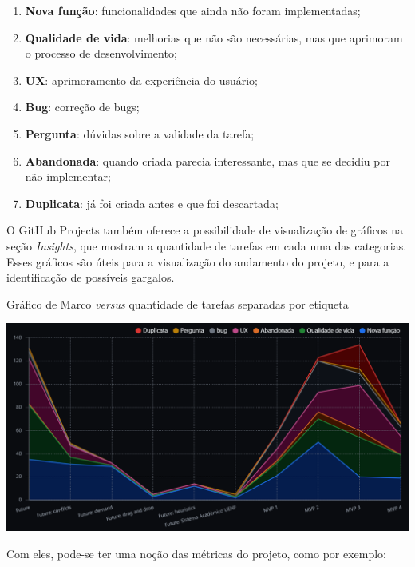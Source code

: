 \begin{enumerate}
  \item \textbf{Nova função}: funcionalidades que ainda não foram implementadas;
  \item \textbf{Qualidade de vida}: melhorias que não são necessárias, mas que aprimoram o processo de desenvolvimento;
  \item \textbf{UX}: aprimoramento da experiência do usuário;
  \item \textbf{Bug}: correção de bugs;
  \item \textbf{Pergunta}: dúvidas sobre a validade da tarefa;
  \item \textbf{Abandonada}: quando criada parecia interessante, mas que se decidiu por não implementar;
  \item \textbf{Duplicata}: já foi criada antes e que foi descartada;
\end{enumerate}

 \label{ssssec:Gráficos}

O GitHub Projects também oferece a possibilidade de visualização de gráficos na seção \textit{Insights}, que mostram a quantidade de tarefas em cada uma das categorias. Esses gráficos são úteis para a visualização do andamento do projeto, e para a identificação de possíveis gargalos.

\begin{MyCenteredFigure} \caption{Gráfico de Marco \textit{versus} quantidade de tarefas separadas por etiqueta} \label{fig:ProjectsInsights}
  \includegraphics[width=\textwidth]{files/img/2.02!5-desenvolvimento/2.02!5.1.4-sistema/GitHub Projects/GitHubProjects-Insights-Stacked_Line-Milestone_Label}
\end{MyCenteredFigure}

Com eles, pode-se ter uma noção das métricas do projeto, como por exemplo:

